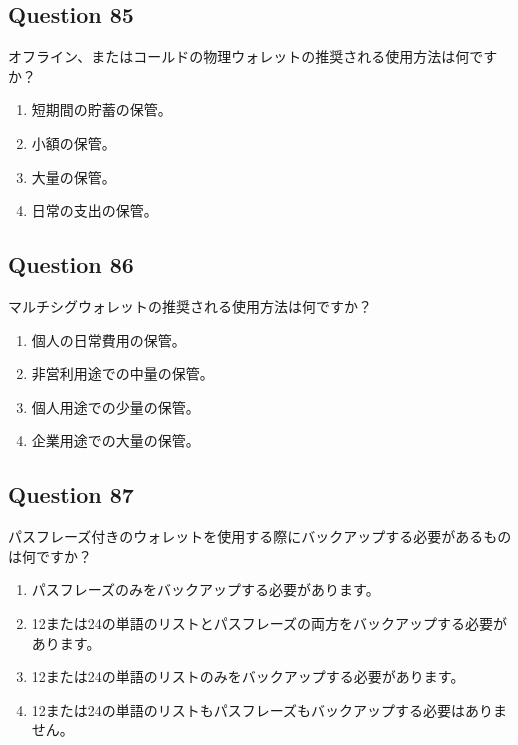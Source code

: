 \documentclass[12pt,a4paper]{article}
\begin{document}
\bigskip


\subsection*{Question 85}
オフライン、またはコールドの物理ウォレットの推奨される使用方法は何ですか？

\begin{enumerate}[label=\Alph*., leftmargin=*]
\item 短期間の貯蓄の保管。
\item 小額の保管。
\item 大量の保管。
\item 日常の支出の保管。
\end{enumerate}

\bigskip


\subsection*{Question 86}
マルチシグウォレットの推奨される使用方法は何ですか？

\begin{enumerate}[label=\Alph*., leftmargin=*]
\item 個人の日常費用の保管。
\item 非営利用途での中量の保管。
\item 個人用途での少量の保管。
\item 企業用途での大量の保管。
\end{enumerate}

\bigskip


\subsection*{Question 87}
パスフレーズ付きのウォレットを使用する際にバックアップする必要があるものは何ですか？

\begin{enumerate}[label=\Alph*., leftmargin=*]
\item パスフレーズのみをバックアップする必要があります。
\item 12または24の単語のリストとパスフレーズの両方をバックアップする必要があります。
\item 12または24の単語のリストのみをバックアップする必要があります。
\item 12または24の単語のリストもパスフレーズもバックアップする必要はありません。
\end{enumerate}

\bigskip
\end{document}
